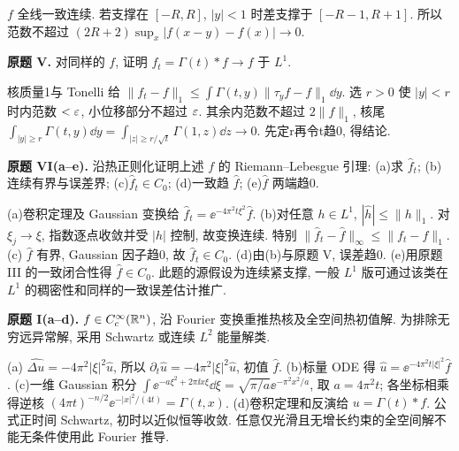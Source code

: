 \begin{solution}
$f$ 全线一致连续. 若支撑在 $[-R,R]$, $|y|<1$ 时差支撑于 $[-R-1,R+1]$. 所以范数不超过 $(2R+2)\sup_x|f(x-y)-f(x)|\to0$.
\end{solution}
\begin{exercise}\label{ps:9V}
\textbf{原题 V.} 对同样的 $f$, 证明 $f_t=\Gamma(t)*f\to f$ 于 $L^1$.
\end{exercise}
\begin{solution}
核质量1与 Tonelli 给 $\|f_t-f\|_1\le\int\Gamma(t,y)\|\tau_yf-f\|_1\dd y$. 选 $r>0$ 使 $|y|<r$ 时内范数 $<\varepsilon$, 小位移部分不超过 $\varepsilon$. 其余内范数不超过 $2\|f\|_1$, 核尾 $\int_{|y|\ge r}\Gamma(t,y)\dd y=\int_{|z|\ge r/\sqrt t}\Gamma(1,z)\dd z\to0$. 先定r再令t趋0, 得结论.
\end{solution}
\begin{exercise}\label{ps:9VI}
\textbf{原题 VI(a--e).} 沿热正则化证明上述 $f$ 的 Riemann--Lebesgue 引理: (a)求 $\widehat f_t$; (b)连续有界与误差界; (c)$\widehat f_t\in C_0$; (d)一致趋 $\widehat f$; (e)$\widehat f$ 两端趋0.
\end{exercise}
\begin{solution}
(a)卷积定理及 Gaussian 变换给 $\widehat f_t=\ee^{-4\pi^2t\xi^2}\widehat f$.
(b)对任意 $h\in L^1$, $|\widehat h|\le\|h\|_1$. 对 $\xi_j\to\xi$, 指数逐点收敛并受 $|h|$ 控制, 故变换连续. 特别 $\|\widehat f_t-\widehat f\|_\infty\le\|f_t-f\|_1$.
(c) $\widehat f$ 有界, Gaussian 因子趋0, 故 $\widehat f_t\in C_0$.
(d)由(b)与原题 V, 误差趋0.
(e)用原题 III 的一致闭合性得 $\widehat f\in C_0$. 此题的源假设为连续紧支撑, 一般 $L^1$ 版可通过该类在 $L^1$ 的稠密性和同样的一致误差估计推广.
\end{solution}
\begin{exercise}\label{ps:10I}
\textbf{原题 I(a--d).} $f\in C_c^\infty(\mathbb R^n)$, 沿 Fourier 变换重推热核及全空间热初值解. 为排除无穷远异常解, 采用 Schwartz 或连续 $L^2$ 能量解类.
\end{exercise}
\begin{solution}
(a) $\widehat{\Delta u}=-4\pi^2|\xi|^2\widehat u$, 所以 $\partial_t\widehat u=-4\pi^2|\xi|^2\widehat u$, 初值 $\widehat f$.
(b)标量 ODE 得 $\widehat u=\ee^{-4\pi^2t|\xi|^2}\widehat f$.
(c)一维 Gaussian 积分 $\int\ee^{-a\xi^2+2\pi\ii x\xi}\dd\xi=\sqrt{\pi/a}\ee^{-\pi^2x^2/a}$, 取 $a=4\pi^2t$; 各坐标相乘得逆核 $(4\pi t)^{-n/2}\ee^{-|x|^2/(4t)}=\Gamma(t,x)$.
(d)卷积定理和反演给 $u=\Gamma(t)*f$. 公式正时间 Schwartz, 初时以近似恒等收敛. 任意仅光滑且无增长约束的全空间解不能无条件使用此 Fourier 推导.
\end{solution}
